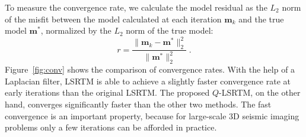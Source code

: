 
To measure the convergence rate, we calculate the model residual as the $L_2$ norm of the misfit between the model calculated at each iteration $\mathbf{m}_k$ and the true model $\mathbf{m}^*$, normalized by the $L_2$ norm of the true model:
\begin{equation}
    r = {\frac{\|\mathbf{m}_k - \mathbf{m}^* \|^2_2}{\|\mathbf{m}^*\|^2_2}} \; .
    \label{eq:res}
\end{equation}
Figure~\ref{fig:conv} shows the comparison of convergence rates. With the help of a Laplacian filter, LSRTM is able to achieve a slightly faster convergence rate at early iterations than the original LSRTM. The proposed $Q$-LSRTM, on the other hand, converges significantly faster than the other two methods.  The fast convergence is an important property, because for large-scale 3D seismic imaging problems only a few iterations can be afforded in practice.


